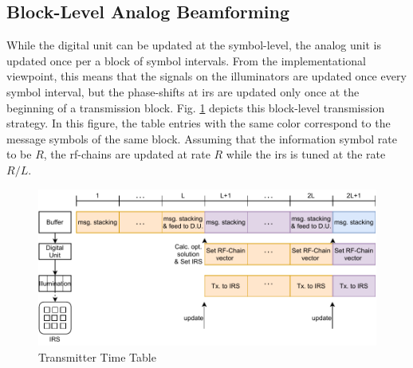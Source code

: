 \documentclass[12pt,draftclsnofoot,onecolumn,journal]{IEEEtran}
\begin{document}
\subsection{Block-Level Analog Beamforming}
While the digital unit can be updated at the symbol-level, the analog unit is updated once per a block of symbol intervals. From the implementational viewpoint, this means that the signals on the illuminators are updated once every symbol interval, but the phase-shifts at \ac{irs} are updated only once at the beginning of a transmission block. Fig. \ref{fig:abssys} depicts this block-level transmission strategy. In this figure, the table entries with the same color correspond to the message symbols of the same block. %
Assuming that the information symbol rate to be $R$, the \ac{rf}-chains are updated at rate $R$ while the \ac{irs} is tuned at the rate $R/L$.
\begin{figure}[t]\flushleft
	\includegraphics[width=6in]{modeltime.pdf} 
	\caption{Transmitter Time Table} \label{fig:abssys}
\end{figure}
\end{document}
